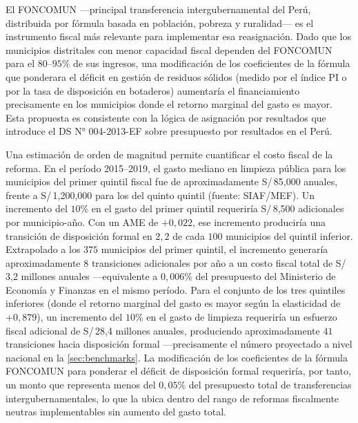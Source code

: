 El FONCOMUN ---principal transferencia intergubernamental del Perú, distribuida por fórmula basada en población, pobreza y ruralidad--- es el instrumento fiscal más relevante para implementar esa reasignación. Dado que los municipios distritales con menor capacidad fiscal dependen del FONCOMUN para el $80$--$95\%$ de sus ingresos, una modificación de los coeficientes de la fórmula que ponderara el déficit en gestión de residuos sólidos (medido por el índice PI o por la tasa de disposición en botaderos) aumentaría el financiamiento precisamente en los municipios donde el retorno marginal del gasto es mayor. Esta propuesta es consistente con la lógica de asignación por resultados que introduce el DS N° 004-2013-EF sobre presupuesto por resultados en el Perú.

Una estimación de orden de magnitud permite cuantificar el costo fiscal de la reforma.
En el período 2015--2019, el gasto mediano en limpieza pública para los municipios del primer quintil fiscal fue de aproximadamente S/\,85{,}000 anuales, frente a S/\,1{,}200{,}000 para los del quinto quintil (fuente: SIAF/MEF).
Un incremento del $10\%$ en el gasto del primer quintil requeriría S/\,8{,}500 adicionales por municipio-año.
Con un AME de $+0{,}022$, ese incremento produciría una transición de disposición formal en $2{,}2$ de cada $100$ municipios del quintil inferior.
Extrapolado a los $375$ municipios del primer quintil, el incremento generaría aproximadamente $8$ transiciones adicionales por año a un costo fiscal total de S/\,3{,}2 millones anuales ---equivalente a $0{,}006\%$ del presupuesto del Ministerio de Economía y Finanzas en el mismo período.
Para el conjunto de los tres quintiles inferiores (donde el retorno marginal del gasto es mayor según la elasticidad de $+0{,}879$), un incremento del $10\%$ en el gasto de limpieza requeriría un esfuerzo fiscal adicional de S/\,28{,}4 millones anuales, produciendo aproximadamente $41$ transiciones hacia disposición formal ---precisamente el número proyectado a nivel nacional en la \cref{sec:benchmarks}.
La modificación de los coeficientes de la fórmula FONCOMUN para ponderar el déficit de disposición formal requeriría, por tanto, un monto que representa menos del $0{,}05\%$ del presupuesto total de transferencias intergubernamentales, lo que la ubica dentro del rango de reformas fiscalmente neutras implementables sin aumento del gasto total.

